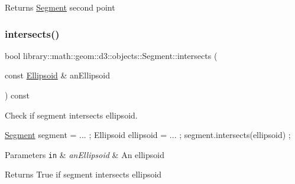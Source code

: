 \begin{DoxyReturn}{Returns}
\hyperlink{classlibrary_1_1math_1_1geom_1_1d3_1_1objects_1_1_segment}{Segment} second point 
\end{DoxyReturn}
\mbox{\label{classlibrary_1_1math_1_1geom_1_1d3_1_1objects_1_1_segment_af6d7eb00a6886d190c03e8b8e4220f33}} 
\subsubsection{\texorpdfstring{intersects()}{intersects()}}
{\footnotesize\ttfamily bool library\+::math\+::geom\+::d3\+::objects\+::\+Segment\+::intersects (\begin{DoxyParamCaption}\item[{const \hyperlink{classlibrary_1_1math_1_1geom_1_1d3_1_1objects_1_1_ellipsoid}{Ellipsoid} \&}]{an\+Ellipsoid }\end{DoxyParamCaption}) const}



Check if segment intersects ellipsoid. 


\begin{DoxyCode}
\hyperlink{classlibrary_1_1math_1_1geom_1_1d3_1_1objects_1_1_segment_a5562342d1edf2f52e37ce1bc138ee7d7}{Segment} segment = ... ;
Ellipsoid ellipsoid = ... ;
segment.intersects(ellipsoid) ;
\end{DoxyCode}



\begin{DoxyParams}[1]{Parameters}
\mbox{\tt in}  & {\em an\+Ellipsoid} & An ellipsoid \\
\hline
\end{DoxyParams}
\begin{DoxyReturn}{Returns}
True if segment intersects ellipsoid 
\end{DoxyReturn}
\mbox{\label{classlibrary_1_1math_1_1geom_1_1d3_1_1objects_1_1_segment_a70a29c3822e4859a2e8cd4a52e1b26f5}} 
